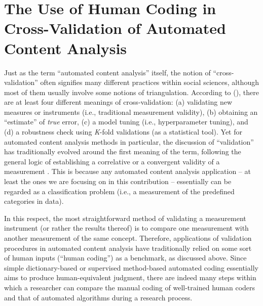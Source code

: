 \documentclass[man, 12pt, a4paper, nolmodern, noextraspace]{apa6}
\begin{document}
\section{The Use of Human Coding in Cross-Validation of Automated Content Analysis}
    
    Just as the term \enquote{automated content analysis} itself, the notion of \enquote{cross-validation} often signifies many different practices within social sciences, although most of them usually involve some notions of triangulation. According to \citeauthor{Neunhoeffer2018} (\citeyear{Neunhoeffer2018}), there are at least four different meanings of cross-validation: (a) validating new measures or instruments (i.e., traditional measurement validity), (b) obtaining an \enquote{estimate} of \textit{true} error, (c) a model tuning (i.e., hyperparameter tuning), and (d) a robustness check using \textit{K}-fold validations (as a statistical tool). Yet for automated content analysis methods in particular, the discussion of \enquote{validation} has traditionally evolved around the first meaning of the term, following the general logic of establishing a correlative or a convergent validity of a measurement \parencites[][]{Krippendorff2008validity}. This is because any automated content analysis application -- at least the ones we are focusing on in this contribution -- essentially can be regarded as a classification problem (i.e., a measurement of the predefined categories in data). 
    
    In this respect, the most straightforward method of validating a measurement instrument (or rather the results thereof) is to compare one measurement with another measurement of the same concept. Therefore, applications of validation procedures in automated content analysis have traditionally relied on some sort of human inputs (“human coding”) as a benchmark, as discussed above. Since simple dictionary-based or supervised method-based automated coding essentially aims to produce human-equivalent judgment, there are indeed many steps within which a researcher can compare the manual coding of well-trained human coders and that of automated algorithms during a research process.
    
\end{document}
